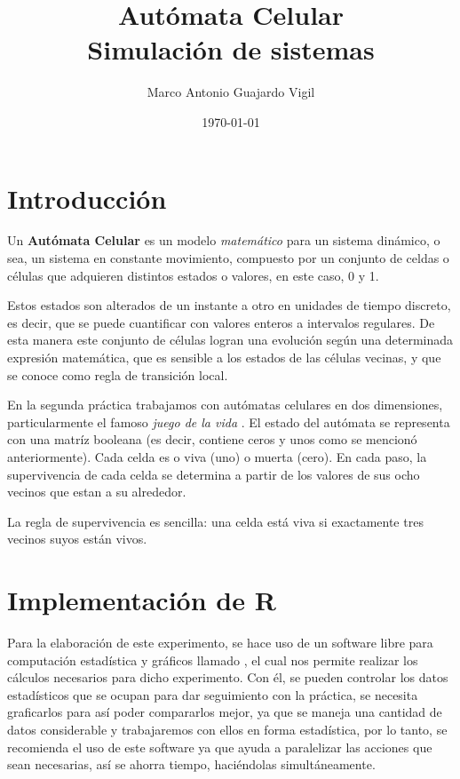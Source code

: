 \documentclass{article}
\author{Marco Antonio Guajardo Vigil}
\title{\textbf{Aut\'omata Celular} \\ Simulaci\'on de sistemas}
\date{\today}
\begin{document}
\maketitle

\section{Introducci\'on}

Un \textbf{Aut\'omata Celular} \cite{AC} es un modelo \textit{matem\'atico} para un sistema din\'amico, o sea, un sistema en constante movimiento, compuesto por un conjunto de celdas o c\'elulas que adquieren distintos estados o valores, en este caso, 0 y 1. 

Estos estados son alterados de un instante a otro en unidades de tiempo discreto, es decir, que se puede cuantificar con valores enteros a intervalos regulares. 
De esta manera este conjunto de c\'elulas logran una evoluci\'on seg\'un una determinada expresi\'on matem\'atica, que es sensible a los estados de las c\'elulas vecinas, y que se conoce como regla de transici\'on local.

En la segunda pr\'actica \cite{SatuP2} trabajamos con aut\'omatas celulares en dos dimensiones, particularmente el famoso \textit{juego de la vida} \cite{JuegoVida}. El estado del aut\'omata se representa con una matr\'iz booleana (es decir, contiene ceros y unos como se mencion\'o anteriormente). Cada celda es o viva (uno) o muerta (cero). En cada paso, la supervivencia de cada celda se determina a partir de los valores de sus ocho vecinos que estan a su alrededor.

La regla de supervivencia es sencilla: una celda est\'a viva si exactamente tres vecinos suyos est\'an vivos.

\section{Implementaci\'on de R}
Para la elaboraci\'on de este experimento, se hace uso de un software libre para computaci\'on estad\'istica y gr\'aficos llamado \citet{R}, el cual nos permite realizar los c\'alculos necesarios para dicho experimento. Con \'el, se pueden controlar los datos estad\'isticos que se ocupan para dar seguimiento con la pr\'actica, se necesita graficarlos para as\'i poder compararlos mejor, ya que se maneja una cantidad de datos considerable y trabajaremos con ellos en forma estad\'istica, por lo tanto, se recomienda el uso de este software ya que ayuda a paralelizar las acciones que sean necesarias, as\'i se ahorra tiempo, haci\'endolas simult\'aneamente.
\end{document}
